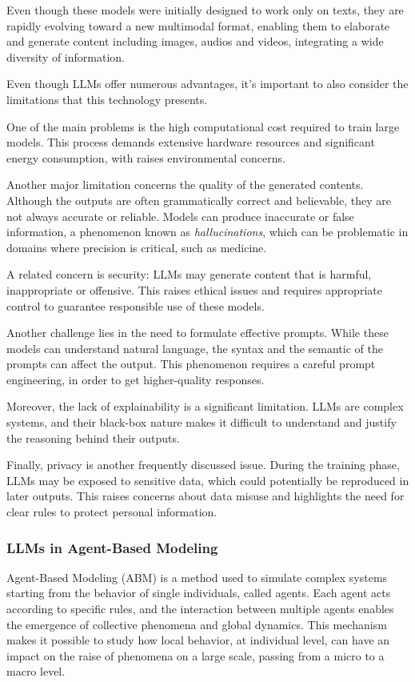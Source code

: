 \medskip
Even though these models were initially designed to work only on texts, they are rapidly evolving toward a new multimodal format, enabling them to elaborate and generate content including images, audios and videos, integrating a wide diversity of information.


\medskip
Even though LLMs offer numerous advantages, it's important to also consider the limitations that this technology presents.

One of the main problems is the high computational cost required to train large models.
This process demands extensive hardware resources and significant energy consumption, with raises environmental concerns.

Another major limitation concerns the quality of the generated contents. Although the outputs are often grammatically correct and believable, they are not always accurate or reliable. Models can produce inaccurate or false information, a phenomenon known as \textit{hallucinations}, which can be problematic in domains where precision is critical, such as medicine.

A related concern is security: LLMs may generate content that is harmful, inappropriate or offensive. This raises ethical issues and requires appropriate control to guarantee responsible use of these models.

Another challenge lies in the need to formulate effective prompts. While these models can understand natural language, the syntax and the semantic of the prompts can affect the output. This phenomenon requires a careful prompt engineering, in order to get higher-quality responses.

Moreover, the lack of explainability is a significant limitation. LLMs are complex systems, and their black-box nature makes it difficult to understand and justify the reasoning behind their outputs.

Finally, privacy is another frequently discussed issue. During the training phase, LLMs may be exposed to sensitive data, which could potentially be reproduced in later outputs. This raises concerns about data misuse and highlights the need for clear rules to protect personal information.


\subsubsection{LLMs in Agent-Based Modeling}
Agent-Based Modeling (ABM) is a method used to simulate complex systems starting from the behavior of single individuals, called agents.
Each agent acts according to specific rules, and the interaction between multiple agents enables the emergence of collective phenomena and global dynamics.
This mechanism makes it possible to study how local behavior, at individual level, can have an impact on the raise of phenomena on a large scale, passing from a micro to a macro level.

